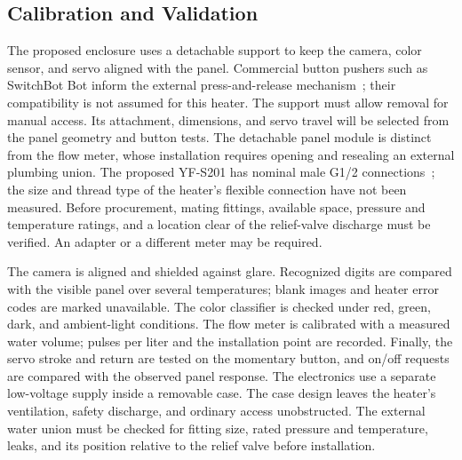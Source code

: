 \subsection{Calibration and Validation}
The proposed enclosure uses a detachable support to keep the camera, color sensor, and servo aligned with the panel. Commercial button pushers such as SwitchBot Bot inform the external press-and-release mechanism~\cite{switchbot}; their compatibility is not assumed for this heater. The support must allow removal for manual access. Its attachment, dimensions, and servo travel will be selected from the panel geometry and button tests. The detachable panel module is distinct from the flow meter, whose installation requires opening and resealing an external plumbing union. The proposed YF-S201 has nominal male G1/2 connections~\cite{seeedflow}; the size and thread type of the heater's flexible connection have not been measured. Before procurement, mating fittings, available space, pressure and temperature ratings, and a location clear of the relief-valve discharge must be verified. An adapter or a different meter may be required.

The camera is aligned and shielded against glare. Recognized digits are compared with the visible panel over several temperatures; blank images and heater error codes are marked unavailable. The color classifier is checked under red, green, dark, and ambient-light conditions. The flow meter is calibrated with a measured water volume; pulses per liter and the installation point are recorded. Finally, the servo stroke and return are tested on the momentary button, and on/off requests are compared with the observed panel response. The electronics use a separate low-voltage supply inside a removable case. The case design leaves the heater's ventilation, safety discharge, and ordinary access unobstructed. The external water union must be checked for fitting size, rated pressure and temperature, leaks, and its position relative to the relief valve before installation.
